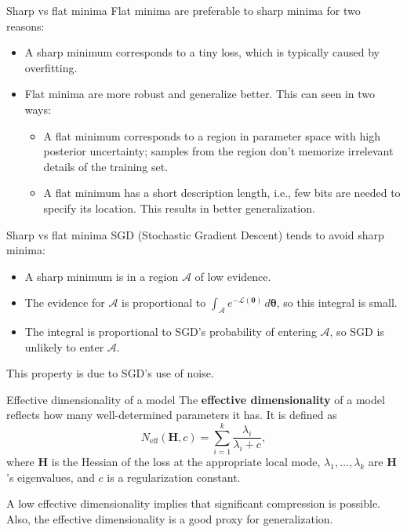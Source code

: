 \documentclass{beamer}
\begin{document}
\begin{frame}{Sharp vs flat minima}
    Flat minima are preferable to sharp minima for two reasons:
    \begin{itemize}
        \item A sharp minimum corresponds to a tiny loss, which is typically caused by overfitting.
        \item Flat minima are more robust and generalize better. This can seen in two ways:
            \begin{itemize}
                \item A flat minimum corresponds to a region in parameter space with high posterior uncertainty; samples from the region don't memorize irrelevant details of the training set.
                \item A flat minimum has a short description length, i.e., few bits are needed to specify its location. This results in better generalization.
            \end{itemize}
    \end{itemize}
\end{frame}

\begin{frame}{Sharp vs flat minima}
    SGD (Stochastic Gradient Descent) tends to avoid sharp minima:
    \begin{itemize}
        \item A sharp minimum is in a region $\mathcal{A}$ of low evidence.
        \item The evidence for $\mathcal{A}$ is proportional to $\int_{\mathcal{A}} e^{-\mathcal{L}(\boldsymbol{\theta})}\,d\boldsymbol{\theta}$, so this integral is small.
        \item The integral is proportional to SGD's probability of entering $\mathcal{A}$, so SGD is unlikely to enter $\mathcal{A}$.
    \end{itemize}
    This property is due to SGD's use of noise.
\end{frame}

\begin{frame}{Effective dimensionality of a model}
    The \textbf{effective dimensionality} of a model reflects how many well-determined parameters it has. It is defined as
    \begin{equation*}
        N_{\text{eff}}(\boldsymbol{H}, c) = \sum_{i = 1}^k \frac{\lambda_i}{\lambda_i + c},
    \end{equation*}
    where $\boldsymbol{H}$ is the Hessian of the loss at the appropriate local mode, $\lambda_1, \ldots, \lambda_k$ are $\boldsymbol{H}$'s eigenvalues, and $c$ is a regularization constant.
    
    \medskip
    
    A low effective dimensionality implies that significant compression is possible. Also, the effective dimensionality is a good proxy for generalization.
\end{frame}
\end{document}
